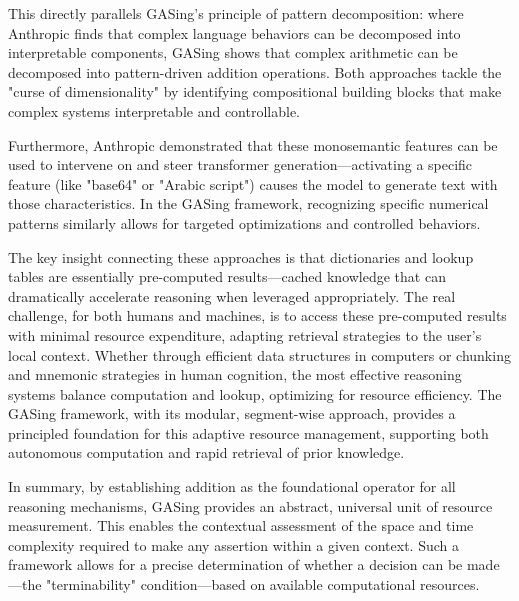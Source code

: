 This directly parallels GASing's principle of pattern decomposition: where Anthropic finds that complex language behaviors can be decomposed into interpretable components, GASing shows that complex arithmetic can be decomposed into pattern-driven addition operations. Both approaches tackle the "curse of dimensionality" by identifying compositional building blocks that make complex systems interpretable and controllable.

Furthermore, Anthropic demonstrated that these monosemantic features can be used to intervene on and steer transformer generation—activating a specific feature (like "base64" or "Arabic script") causes the model to generate text with those characteristics. In the GASing framework, recognizing specific numerical patterns similarly allows for targeted optimizations and controlled behaviors.

The key insight connecting these approaches is that dictionaries and lookup tables are essentially pre-computed results—cached knowledge that can dramatically accelerate reasoning when leveraged appropriately. The real challenge, for both humans and machines, is to access these pre-computed results with minimal resource expenditure, adapting retrieval strategies to the user's local context. Whether through efficient data structures in computers or chunking and mnemonic strategies in human cognition, the most effective reasoning systems balance computation and lookup, optimizing for resource efficiency. The GASing framework, with its modular, segment-wise approach, provides a principled foundation for this adaptive resource management, supporting both autonomous computation and rapid retrieval of prior knowledge.

In summary, by establishing addition as the foundational operator for all reasoning mechanisms, GASing provides an abstract, universal unit of resource measurement. This enables the contextual assessment of the space and time complexity required to make any assertion within a given context. Such a framework allows for a precise determination of whether a decision can be made—the "terminability" condition—based on available computational resources. 

